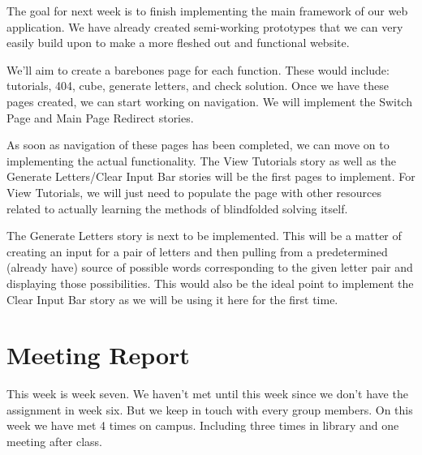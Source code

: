 \documentclass[12pt]{article}
\begin{document}
\par
The goal for next week is to finish implementing the main framework of our web application. We have already created semi-working prototypes that we can very easily build upon to make a more fleshed out and functional website. \\

\par
We’ll aim to create a barebones page for each function. These would include: tutorials, 404, cube, generate letters, and check solution. Once we have these pages created, we can start working on navigation. We will implement the Switch Page and Main Page Redirect stories. \\

\par
As soon as navigation of these pages has been completed, we can move on to implementing the actual functionality. The View Tutorials story as well as the Generate Letters/Clear Input Bar stories will be the first pages to implement. For View Tutorials, we will just need to populate the page with other resources related to actually learning the methods of blindfolded solving itself. \\

\par
The Generate Letters story is next to be implemented. This will be a matter of creating an input for a pair of letters and then pulling from a predetermined (already have) source of possible words corresponding to the given letter pair and displaying those possibilities. This would also be the ideal point to implement the Clear Input Bar story as we will be using it here for the first time. \\

\section{Meeting Report}

\par
This week is week seven. We haven’t met until this week since we don’t have the assignment in week six. But we keep in touch with every group members. On this week we have met 4 times on campus. Including three times in library and one meeting after class. \\
\end{document}
